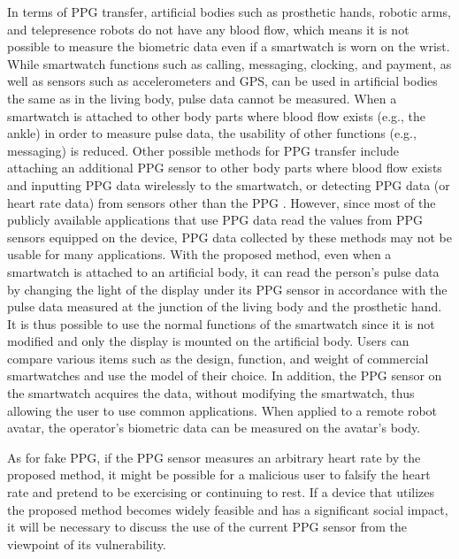 \documentclass[sigchi,authordraft]{acmart}
\begin{document}
In terms of PPG transfer, artificial bodies such as prosthetic hands, robotic arms, and telepresence robots do not have any blood flow, which means it is not possible to measure the biometric data even if a smartwatch is worn on the wrist. While smartwatch functions such as calling, messaging, clocking, and payment, as well as sensors such as accelerometers and GPS, can be used in artificial bodies the same as in the living body, pulse data cannot be measured. When a smartwatch is attached to other body parts where blood flow exists (e.g., the ankle) in order to measure pulse data, the usability of other functions (e.g., messaging) is reduced. Other possible methods for PPG transfer include attaching an additional PPG sensor to other body parts where blood flow exists and inputting PPG data wirelessly to the smartwatch, or detecting PPG data (or heart rate data) from sensors other than the PPG \cite{heart_rate_accelerometer, Biowatch, SeismoTracker, heart_rate_ecg, heart_rate_touchscreen}. However, since most of the publicly available applications that use PPG data read the values from PPG sensors equipped on the device, PPG data collected by these methods may not be usable for many applications. With the proposed method, even when a smartwatch is attached to an artificial body, it can read the person's pulse data by changing the light of the display under its PPG sensor in accordance with the pulse data measured at the junction of the living body and the prosthetic hand. It is thus possible to use the normal functions of the smartwatch since it is not modified and only the display is mounted on the artificial body. Users can compare various items such as the design, function, and weight of commercial smartwatches and use the model of their choice. In addition, the PPG sensor on the smartwatch acquires the data, without modifying the smartwatch, thus allowing the user to use common applications. When applied to a remote robot avatar, the operator's biometric data can be measured on the avatar's body.\par

As for fake PPG, if the PPG sensor measures an arbitrary heart rate by the proposed method, it might be possible for a malicious user to falsify the heart rate and pretend to be exercising or continuing to rest. If a device that utilizes the proposed method becomes widely feasible and has a significant social impact, it will be necessary to discuss the use of the current PPG sensor from the viewpoint of its vulnerability.\par
\end{document}
